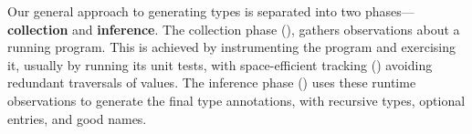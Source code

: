 
%
%
%
%
%


%
Our general approach to generating types
is separated into two phases---\textbf{collection} and
\textbf{inference}.
%
The collection phase (),
gathers observations about a running program.
This is achieved by instrumenting the program and exercising
it, usually by running its unit tests,
with space-efficient tracking ()
avoiding redundant traversals of values.
%
The inference phase ()
uses these runtime observations to generate the final type annotations,
with recursive types, optional entries, and good names.

